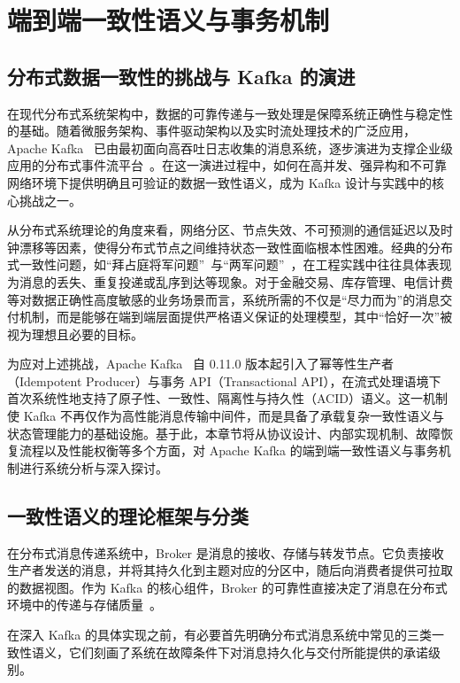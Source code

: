 \section{端到端一致性语义与事务机制}

\subsection{分布式数据一致性的挑战与 Kafka 的演进}
在现代分布式系统架构中，数据的可靠传递与一致处理是保障系统正确性与稳定性的基础。随着微服务架构、事件驱动架构以及实时流处理技术的广泛应用，Apache Kafka~\cite{garg2013apache} 已由最初面向高吞吐日志收集的消息系统，逐步演进为支撑企业级应用的分布式事件流平台~\cite{kreps2011kafka}。在这一演进过程中，如何在高并发、强异构和不可靠网络环境下提供明确且可验证的数据一致性语义，成为 Kafka 设计与实践中的核心挑战之一。

从分布式系统理论的角度来看，网络分区、节点失效、不可预测的通信延迟以及时钟漂移等因素，使得分布式节点之间维持状态一致性面临根本性困难。经典的分布式一致性问题，如“拜占庭将军问题”~\cite{lamport2019byzantine}与“两军问题”~\cite{akkoyunlu1975some}，在工程实践中往往具体表现为消息的丢失、重复投递或乱序到达等现象。对于金融交易、库存管理、电信计费等对数据正确性高度敏感的业务场景而言，系统所需的不仅是“尽力而为”的消息交付机制，而是能够在端到端层面提供严格语义保证的处理模型，其中“恰好一次”被视为理想且必要的目标。

为应对上述挑战，Apache Kafka~\cite{garg2013apache} 自 0.11.0 版本起引入了幂等性生产者（Idempotent Producer）与事务 API（Transactional API），在流式处理语境下首次系统性地支持了原子性、一致性、隔离性与持久性（ACID）语义。这一机制使 Kafka 不再仅作为高性能消息传输中间件，而是具备了承载复杂一致性语义与状态管理能力的基础设施。基于此，本章节将从协议设计、内部实现机制、故障恢复流程以及性能权衡等多个方面，对 Apache Kafka 的端到端一致性语义与事务机制进行系统分析与深入探讨。

\subsection{一致性语义的理论框架与分类}
在分布式消息传递系统中，Broker 是消息的接收、存储与转发节点。它负责接收生产者发送的消息，并将其持久化到主题对应的分区中，随后向消费者提供可拉取的数据视图。作为 Kafka 的核心组件，Broker 的可靠性直接决定了消息在分布式环境中的传递与存储质量~\cite{kreps2011kafka}。

在深入 Kafka 的具体实现之前，有必要首先明确分布式消息系统中常见的三类一致性语义，它们刻画了系统在故障条件下对消息持久化与交付所能提供的承诺级别。

